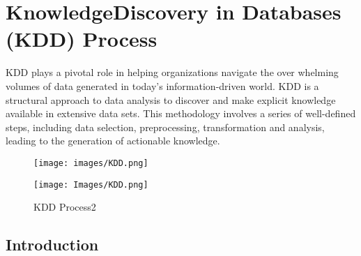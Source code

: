 %
%

\chapter{KnowledgeDiscovery in Databases (KDD) Process}

KDD plays a pivotal role in helping organizations navigate the over whelming volumes of data generated in today’s information-driven world. KDD is a structural approach to data analysis to discover and make explicit knowledge available in extensive data sets. This methodology involves a series of well-defined steps, including data selection, preprocessing, transformation and analysis, leading to the generation of actionable knowledge.

\begin{figure}
\begin{center}
		
		\texttt{[image: images/KDD.png]}
		\label{Arduino PortentaH7 Connected to a Laptop1}
\end{center}
	
\end{figure}

\begin{figure}
	\begin{center}
		\texttt{[image: Images/KDD.png]}
		\caption{KDD Process2}
		\label{KDD Process2}
	\end{center}
\end{figure}

\section{Introduction}
